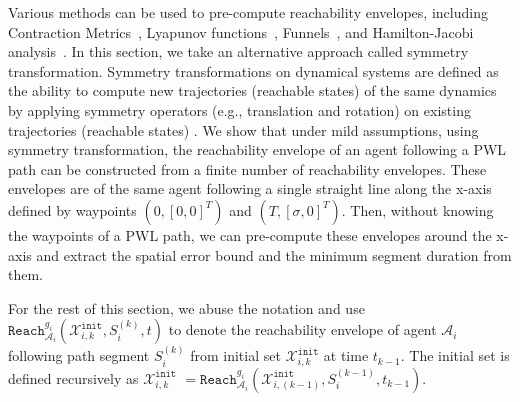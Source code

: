 \documentclass[letterpaper]{article} %
\theoremstyle{definition}
\begin{document}
Various methods can be used to pre-compute reachability envelopes, including Contraction Metrics~\cite{singh2017robust,tsukamoto2020neural}, Lyapunov functions~\cite{fan2020fast}, Funnels~\cite{majumdar2017funnel}, and Hamilton-Jacobi analysis~\cite{herbert2017fastrack}.
In this section, we take an alternative approach called symmetry transformation. Symmetry transformations on dynamical systems are defined as the ability to compute new trajectories (reachable states) of the same dynamics by applying symmetry operators (e.g., translation and rotation) on existing trajectories (reachable states) \cite{russo2011symmetries}. We show that under mild assumptions, using symmetry transformation, the reachability envelope of an agent  following a PWL path can be constructed from a finite number of reachability envelopes. These envelopes are of the same agent following a single straight line along the x-axis defined by waypoints $(0,[0,0]^T)$ and $(T, [\sigma, 0]^T)$. Then, without knowing the waypoints of a PWL path, we can pre-compute these envelopes around the x-axis and extract the spatial error bound and the minimum segment duration from them.


For the rest of this section, we abuse the notation and use $\texttt{Reach}_{\mathcal{A}_i}^{g_i}(\mathcal{X}^\texttt{init}_{i,k}, S_{i}^{(k)}, t)$ to denote the reachability envelope of agent $\mathcal{A}_i$ following path segment $ S_{i}^{(k)}$ from initial set $\mathcal{X}^\texttt{init}_{i,k}$ at time $t_{k-1}$. The initial set is defined recursively as $\mathcal{X}^\texttt{init}_{i,k}$ $=\texttt{Reach}_{\mathcal{A}_i}^{g_i}(\mathcal{X}^\texttt{init}_{i,(k-1)}, S_{i}^{(k-1)}, t_{k-1})$.

\end{document}
